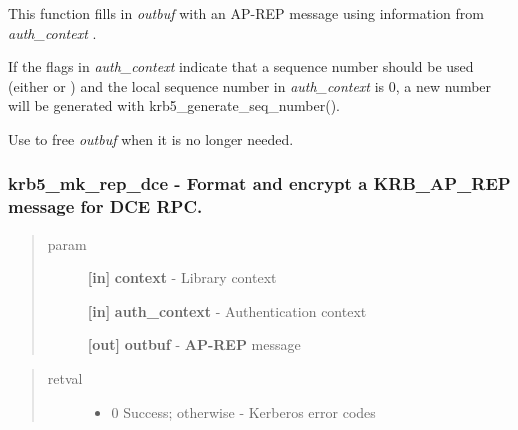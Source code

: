 \documentclass[letterpaper,10pt,english]{sphinxmanual}
\begin{document}
This function fills in \emph{outbuf} with an AP-REP message using information from \emph{auth\_context} .

If the flags in \emph{auth\_context} indicate that a sequence number should be used (either {\hyperref[appdev/refs/macros/KRB5_AUTH_CONTEXT_DO_SEQUENCE:KRB5_AUTH_CONTEXT_DO_SEQUENCE]{}} or {\hyperref[appdev/refs/macros/KRB5_AUTH_CONTEXT_RET_SEQUENCE:KRB5_AUTH_CONTEXT_RET_SEQUENCE]{}} ) and the local sequence number in \emph{auth\_context} is 0, a new number will be generated with krb5\_generate\_seq\_number().

Use {\hyperref[appdev/refs/api/krb5_free_data_contents:krb5_free_data_contents]{}} to free \emph{outbuf} when it is no longer needed.


\subsubsection{krb5\_mk\_rep\_dce -  Format and encrypt a KRB\_AP\_REP message for DCE RPC.}
\label{appdev/refs/api/krb5_mk_rep_dce:krb5-mk-rep-dce-format-and-encrypt-a-krb-ap-rep-message-for-dce-rpc}\label{appdev/refs/api/krb5_mk_rep_dce::doc}

\begin{fulllineitems}
\label{appdev/refs/api/krb5_mk_rep_dce:krb5_mk_rep_dce}
\end{fulllineitems}

\begin{quote}\begin{description}
\item[{param}] \leavevmode
\textbf{{[}in{]}} \textbf{context} - Library context

\textbf{{[}in{]}} \textbf{auth\_context} - Authentication context

\textbf{{[}out{]}} \textbf{outbuf} - \textbf{AP-REP} message

\end{description}\end{quote}
\begin{quote}\begin{description}
\item[{retval}] \leavevmode\begin{itemize}
\item {} 
0   Success; otherwise - Kerberos error codes

\end{itemize}

\end{description}\end{quote}
\end{document}
